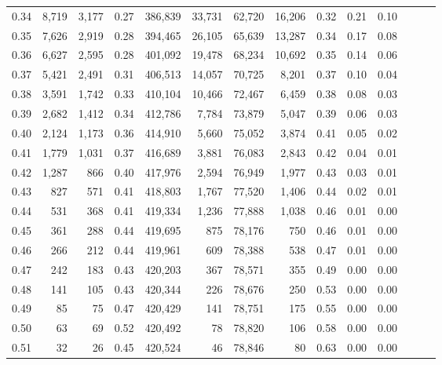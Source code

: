 \begin{tabular}{rrrrrrrrrrrrrr}
0.34 &   8,719 &  3,177 &  0.27 &  386,839 &   33,731 &  62,720 &  16,206 &  0.32 &  0.21 &      0.10 \\
0.35 &   7,626 &  2,919 &  0.28 &  394,465 &   26,105 &  65,639 &  13,287 &  0.34 &  0.17 &      0.08 \\
0.36 &   6,627 &  2,595 &  0.28 &  401,092 &   19,478 &  68,234 &  10,692 &  0.35 &  0.14 &      0.06 \\
0.37 &   5,421 &  2,491 &  0.31 &  406,513 &   14,057 &  70,725 &   8,201 &  0.37 &  0.10 &      0.04 \\
0.38 &   3,591 &  1,742 &  0.33 &  410,104 &   10,466 &  72,467 &   6,459 &  0.38 &  0.08 &      0.03 \\
0.39 &   2,682 &  1,412 &  0.34 &  412,786 &    7,784 &  73,879 &   5,047 &  0.39 &  0.06 &      0.03 \\
0.40 &   2,124 &  1,173 &  0.36 &  414,910 &    5,660 &  75,052 &   3,874 &  0.41 &  0.05 &      0.02 \\
0.41 &   1,779 &  1,031 &  0.37 &  416,689 &    3,881 &  76,083 &   2,843 &  0.42 &  0.04 &      0.01 \\
0.42 &   1,287 &    866 &  0.40 &  417,976 &    2,594 &  76,949 &   1,977 &  0.43 &  0.03 &      0.01 \\
0.43 &     827 &    571 &  0.41 &  418,803 &    1,767 &  77,520 &   1,406 &  0.44 &  0.02 &      0.01 \\
0.44 &     531 &    368 &  0.41 &  419,334 &    1,236 &  77,888 &   1,038 &  0.46 &  0.01 &      0.00 \\
0.45 &     361 &    288 &  0.44 &  419,695 &      875 &  78,176 &     750 &  0.46 &  0.01 &      0.00 \\
0.46 &     266 &    212 &  0.44 &  419,961 &      609 &  78,388 &     538 &  0.47 &  0.01 &      0.00 \\
0.47 &     242 &    183 &  0.43 &  420,203 &      367 &  78,571 &     355 &  0.49 &  0.00 &      0.00 \\
0.48 &     141 &    105 &  0.43 &  420,344 &      226 &  78,676 &     250 &  0.53 &  0.00 &      0.00 \\
0.49 &      85 &     75 &  0.47 &  420,429 &      141 &  78,751 &     175 &  0.55 &  0.00 &      0.00 \\
0.50 &      63 &     69 &  0.52 &  420,492 &       78 &  78,820 &     106 &  0.58 &  0.00 &      0.00 \\
0.51 &      32 &     26 &  0.45 &  420,524 &       46 &  78,846 &      80 &  0.63 &  0.00 &      0.00 \\

\end{tabular}
